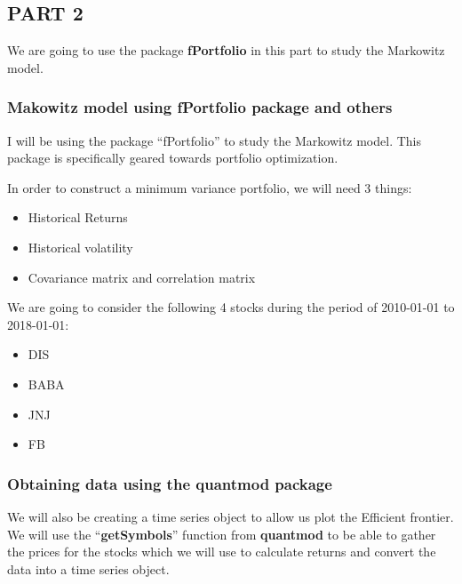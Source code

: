 \documentclass[]{article}
\providecommand{\tightlist}{%
  \setlength{\itemsep}{0pt}\setlength{\parskip}{0pt}}
\begin{document}
\subsection{PART 2}\label{part-2}

We are going to use the package \textbf{fPortfolio} in this part to
study the Markowitz model.

\subsubsection{Makowitz model using fPortfolio package and
others}\label{makowitz-model-using-fportfolio-package-and-others}

I will be using the package ``fPortfolio'' to study the Markowitz model.
This package is specifically geared towards portfolio optimization.

In order to construct a minimum variance portfolio, we will need 3
things:

\begin{itemize}
\tightlist
\item
  Historical Returns
\item
  Historical volatility
\item
  Covariance matrix and correlation matrix
\end{itemize}

We are going to consider the following 4 stocks during the period of
2010-01-01 to 2018-01-01:

\begin{itemize}
\tightlist
\item
  DIS
\item
  BABA
\item
  JNJ
\item
  FB
\end{itemize}

\subsubsection{Obtaining data using the quantmod
package}\label{obtaining-data-using-the-quantmod-package}

We will also be creating a time series object to allow us plot the
Efficient frontier. We will use the ``\textbf{getSymbols}'' function
from \textbf{quantmod} to be able to gather the prices for the stocks
which we will use to calculate returns and convert the data into a time
series object.
\end{document}
